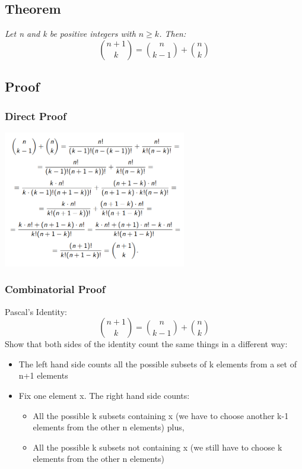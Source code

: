 \documentclass{article}[18pt]
\begin{document}
\subsection{Theorem}
\textit{Let n and k be positive integers with $n\geqslant k$. Then:}
$$\binom{n+1}{k}=\binom{n}{k-1}+\binom{n}{k}$$
\subsection{Proof}
\subsubsection{Direct Proof}
\includegraphics[width=8cm]{pascal_proof.png}
\subsubsection{Combinatorial Proof}
Pascal's Identity:
$$\binom{n+1}{k}=\binom{n}{k-1}+\binom{n}{k}$$
Show that both sides of the identity count the same things in a different way:
\begin{itemize}
\item The left hand side counts all the possible subsets of k elements from a set of n+1 elements

\item Fix one element x. The right hand side counts:
\begin{itemize}
\item All the possible k subsets containing x (we have to choose another k-1 elements from the other n elements) plus,
\item All the possible k subsets not containing x (we still have to choose k elements from the other n elements)
\end{itemize}
\end{itemize}
\end{document}
